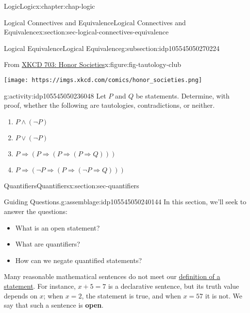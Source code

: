 \documentclass[oneside,10pt,]{book}
\newcommand{\terminology}[1]{\textbf{#1}}
\begin{document}
\begin{chapterptx}{Logic}{}{Logic}{}{}{x:chapter:chap-logic}
\begin{sectionptx}{Logical Connectives and Equivalence}{}{Logical Connectives and Equivalence}{}{}{x:section:sec-logical-connectives-equivalence}
\begin{subsectionptx}{Logical Equivalence}{}{Logical Equivalence}{}{}{g:subsection:idp105545050270224}
\begin{figureptx}{From \href{https://xkcd.com/703/}{XKCD 703: Honor Societies}\protect\footnotemark{}}{x:figure:fig-tautology-club}{}
\begin{image}{0.125}{0.75}{0.125}%
\texttt{[image: https://imgs.xkcd.com/comics/honor\_societies.png]}
\end{image}%
\tcblower
\end{figureptx}%
%
\begin{activity}{}{g:activity:idp105545050236048}%
Let \(P\) and \(Q\) be statements. Determine, with proof, whether the following are tautologies, contradictions, or neither.%
%
\begin{enumerate}
\item{}\(\displaystyle P\land (\neg P)\)%
\item{}\(\displaystyle P\lor (\neg P)\)%
\item{}\(\displaystyle P\Rightarrow (P\Rightarrow (P\Rightarrow (P\Rightarrow Q)))\)%
\item{}\(\displaystyle P\Rightarrow (\neg P\Rightarrow (P\Rightarrow (\neg P\Rightarrow Q)))\)%
\end{enumerate}
\end{activity}%
\end{subsectionptx}
\end{sectionptx}
%
%
\typeout{************************************************}
\typeout{************************************************}
%
\begin{sectionptx}{Quantifiers}{}{Quantifiers}{}{}{x:section:sec-quantifiers}
\begin{assemblage}{Guiding Questions.}{g:assemblage:idp105545050240144}%
In this section, we'll seek to answer the questions: %
\begin{itemize}[label=\textbullet]
\item{}What is an open statement?%
\item{}What are quantifiers?%
\item{}How can we negate quantified statements?%
\end{itemize}
%
\end{assemblage}
\begin{introduction}{}%
Many reasonable mathematical sentences do not meet our \hyperref[x:definition:def-statement]{definition of a statement}. For instance, \(x + 5 = 7\) is a declarative sentence, but its truth value depends on \(x\); when \(x = 2\), the statement is true, and when \(x = 57\) it is not. We say that such a sentence is \terminology{open}.%
\end{introduction}%

\end{sectionptx}
\end{chapterptx}
\end{document}
